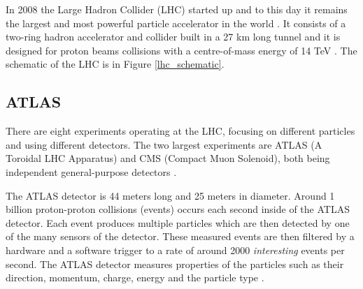 \documentclass{ctuthesis}
\begin{document}
In 2008 the Large Hadron Collider (LHC) started up and to this day it remains the largest and most powerful particle accelerator in the world \cite{lhc1}. It consists of a two-ring hadron accelerator and collider built in a 27 km long tunnel and it is designed for proton beams collisions with a centre-of-mass energy of 14 TeV \cite{lhc2}. The schematic of the LHC is in Figure \ref{lhc_schematic}.

\begin{figure}[h]
\end{figure}

\subsection{ATLAS}
There are eight experiments operating at the LHC, focusing on different particles and using different detectors. The two largest experiments are ATLAS (A Toroidal LHC Apparatus) and CMS (Compact Muon Solenoid), both being independent general-purpose detectors \cite{atlas1}.

The ATLAS detector is 44 meters long and 25 meters in diameter. Around 1 billion proton-proton collisions (events) occurs each second inside of the ATLAS detector. Each event produces multiple particles which are then detected by one of the many sensors of the detector. These measured events are then filtered by a hardware and a software trigger to a rate of around 2000 \emph{interesting} events per second. The ATLAS detector measures properties of the particles such as their direction, momentum, charge, energy and the particle type \cite{atlas2}.


\begin{figure}[h]
\end{figure}
\end{document}
